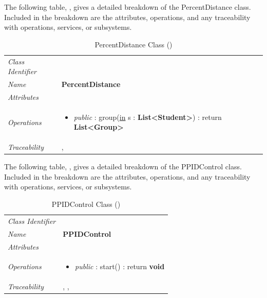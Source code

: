 \documentclass[12pt,letterpaper]{article}
\begin{document}
The following table, , gives a detailed breakdown of the PercentDistance class. Included in the breakdown are the attributes, operations, and any traceability with operations, services, or subsystems.

\begin{table}[H]
    \caption{PercentDistance Class ()} 
	\begin{tabu} to 
		\toprule
		Class Identifier &  \\
		Name & {\bf PercentDistance} \\
		Attributes & \\

		Operations &
		\begin{minipage}[t]{\linewidth}
			\begin{itemize}
			    \item {\it public} : group(\underline{in} s : {\bf List<Student>}) : return {\bf List<Group>}
	        \end{itemize}
	    \end{minipage} \\
	    	Traceability & , \\
		\toprule
	\end{tabu}
\end{table}

The following table, , gives a detailed breakdown of the PPIDControl class. Included in the breakdown are the attributes, operations, and any traceability with operations, services, or subsystems.

\begin{table}[H]
    \caption{PPIDControl Class ()} 
	\begin{tabu} to 
		\toprule
		Class Identifier &  \\
		Name & {\bf PPIDControl} \\
		Attributes & \\

		Operations &
		\begin{minipage}[t]{\linewidth}
			\begin{itemize}
			    \item {\it public} : start() : return {\bf void}
	        \end{itemize}
	    \end{minipage} \\
	    	Traceability & , , \\
		\toprule
	\end{tabu}
\end{table}
\end{document}
